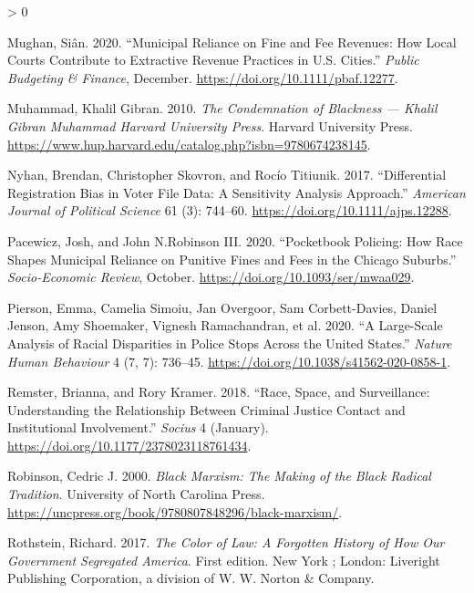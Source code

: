 \documentclass[
  12pt,
]{article}
\newlength{\cslhangindent}
\newenvironment{CSLReferences}[2] %
 {%
  \setlength{\parindent}{0pt}
  \ifodd #1 \everypar{\setlength{\hangindent}{\cslhangindent}}\ignorespaces\fi
  \ifnum #2 > 0
  \setlength{\parskip}{#2\baselineskip}
  \fi
 }%
 {}
\begin{document}
\begin{CSLReferences}{1}{0}
\leavevmode\hypertarget{ref-Mughan2020}{}%
Mughan, Siân. 2020. {``Municipal {Reliance} on {Fine} and {Fee Revenues}: {How Local Courts Contribute} to {Extractive Revenue Practices} in {U}.{S}. {Cities}.''} \emph{Public Budgeting \& Finance}, December. \url{https://doi.org/10.1111/pbaf.12277}.

\leavevmode\hypertarget{ref-Muhammad2010}{}%
Muhammad, Khalil Gibran. 2010. \emph{The {Condemnation} of {Blackness} --- {Khalil Gibran Muhammad} \textbar{} {Harvard University Press}}. {Harvard University Press}. \url{https://www.hup.harvard.edu/catalog.php?isbn=9780674238145}.

\leavevmode\hypertarget{ref-Nyhan2017}{}%
Nyhan, Brendan, Christopher Skovron, and Rocío Titiunik. 2017. {``Differential {Registration Bias} in {Voter File Data}: {A Sensitivity Analysis Approach}.''} \emph{American Journal of Political Science} 61 (3): 744--60. \url{https://doi.org/10.1111/ajps.12288}.

\leavevmode\hypertarget{ref-Pacewicz2020}{}%
Pacewicz, Josh, and John N.Robinson III. 2020. {``Pocketbook Policing: {How} Race Shapes Municipal Reliance on Punitive Fines and Fees in the {Chicago} Suburbs.''} \emph{Socio-Economic Review}, October. \url{https://doi.org/10.1093/ser/mwaa029}.

\leavevmode\hypertarget{ref-Pierson2020}{}%
Pierson, Emma, Camelia Simoiu, Jan Overgoor, Sam Corbett-Davies, Daniel Jenson, Amy Shoemaker, Vignesh Ramachandran, et al. 2020. {``A Large-Scale Analysis of Racial Disparities in Police Stops Across the {United States}.''} \emph{Nature Human Behaviour} 4 (7, 7): 736--45. \url{https://doi.org/10.1038/s41562-020-0858-1}.

\leavevmode\hypertarget{ref-Remster2018a}{}%
Remster, Brianna, and Rory Kramer. 2018. {``Race, {Space}, and {Surveillance}: {Understanding} the {Relationship} Between {Criminal Justice Contact} and {Institutional Involvement}.''} \emph{Socius} 4 (January). \url{https://doi.org/10.1177/2378023118761434}.

\leavevmode\hypertarget{ref-Robinson2000}{}%
Robinson, Cedric J. 2000. \emph{Black {Marxism}: The {Making} of the {Black Radical Tradition}}. {University of North Carolina Press}. \url{https://uncpress.org/book/9780807848296/black-marxism/}.

\leavevmode\hypertarget{ref-Rothstein2017}{}%
Rothstein, Richard. 2017. \emph{The Color of Law: A Forgotten History of How Our Government Segregated {America}}. First edition. {New York ; London}: {Liveright Publishing Corporation, a division of W. W. Norton \& Company}.


\end{CSLReferences}
\end{document}
